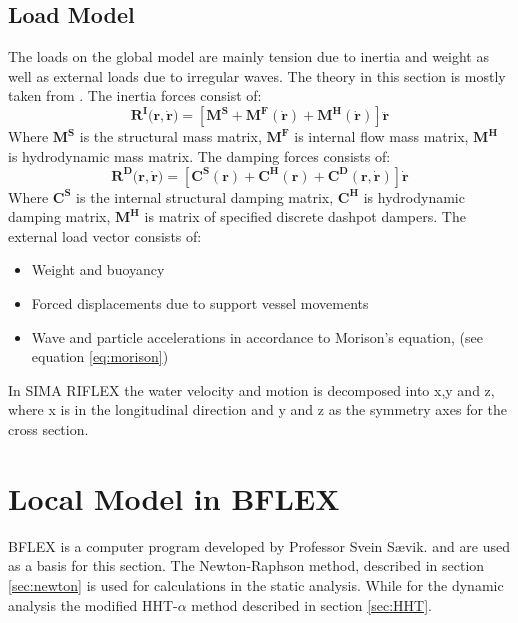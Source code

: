 \subsection{Load Model}
The loads on the global model are mainly tension due to inertia and weight as well as external loads due to irregular waves. The theory in this section is mostly taken from \cite{sintef2017}.\newline
\newline
\noindent The inertia forces consist of:
\begin{equation}
    \boldsymbol{R^I(r,\dot{r}})= [\boldsymbol{M^S} + \boldsymbol{M^F(\dot{r})} + \boldsymbol{M^H (\dot{r})} ]\boldsymbol{\ddot{r}}
\end{equation}
Where $\boldsymbol{M^S}$ is the structural mass matrix, $\boldsymbol{M^F}$ is internal flow mass matrix, $\boldsymbol{M^H}$ is hydrodynamic mass matrix. 
\newline
\newline
\noindent The damping forces consists of:
\begin{equation}
    \boldsymbol{R^D(r,\dot{r}})= [\boldsymbol{C^S(r)} + \boldsymbol{C^H(r)} + \boldsymbol{C^D (r,\dot{r})} ]\boldsymbol{\dot{r}}
\end{equation}
Where $\boldsymbol{C^S}$ is the  internal structural damping matrix, $\boldsymbol{C^H}$ is hydrodynamic damping matrix, $\boldsymbol{M^H}$ is matrix of specified discrete dashpot dampers. \newline
\newline
\noindent The external load vector consists of:
\begin{itemize}
\item Weight and buoyancy
\item Forced displacements due to support vessel movements
\item Wave and particle accelerations in accordance to Morison's equation, (see equation \ref{eq:morison})
\end{itemize}
In SIMA RIFLEX the water velocity and motion is decomposed into x,y and z, where x is in the longitudinal direction and y and z as the symmetry axes for the cross section.

\section{Local Model in BFLEX }
BFLEX is a computer program developed by Professor Svein Sævik. \cite{Bflextheory2013}  and \cite{Bflextheory2017} are used as a basis for this section.  The Newton-Raphson method, described in section \ref{sec:newton} is used for calculations in the static analysis. While for the dynamic analysis the modified HHT-$\alpha$ method described in section \ref{sec:HHT}.

